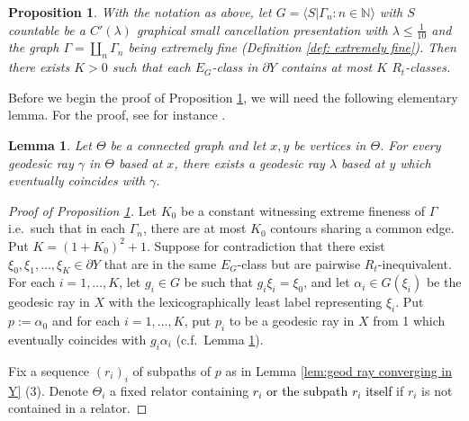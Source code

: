 \documentclass{article}[11pt]
\newtheorem{prop}[thm]{Proposition}
\newtheorem{lem}[thm]{Lemma}
\newcommand{\N}{\mathbb{N}}
\newcommand{\girth}{\mathrm{girth}}
\begin{document}
{\begin{prop}
    \label{prop: finite index}
    With the notation as above, let $G = \langle S \vert \Gamma_n : n \in \N \rangle$ with $S$ countable be a $C'(\lambda)$ graphical small cancellation presentation with $\lambda \leq \frac1{10}$ and the graph $\Gamma = \coprod_n \Gamma_n$ being extremely fine (Definition \ref{def: extremely fine}). Then there exists $K > 0$ such that each $E_G$-class in $\partial Y$ contains at most $K$ $R_t$-classes. 
\end{prop}

Before we begin the proof of Proposition \ref{prop: finite index}, we will need the following elementary lemma. For the proof, see for instance \cite[Lemma 3.1]{MS20}.


\begin{lem}
    \label{lem: moving geodesic basepoint}
    Let $\Theta$ be a connected graph and let $x,y$ be vertices in $\Theta$. For every geodesic ray $\gamma$ in $\Theta$ based at $x$, there exists a geodesic ray $\lambda$ based at $y$ which eventually coincides with $\gamma$. 
\end{lem}

\begin{proof}[Proof of Proposition \ref{prop: finite index}]
    
    Let $K_0$ be a constant witnessing extreme fineness of $\Gamma$ i.e.\ such that in each $\Gamma_n$, there are at most $K_0$ contours sharing a common edge. Put $K = (1+K_0)^2 + 1$. Suppose for contradiction that there exist $\xi_0,\xi_1,\ldots, \xi_K \in \partial Y$ that are in the same $E_G$-class but are pairwise $R_t$-inequivalent. For each $i = 1,\ldots,K$, let $g_i \in G$ be such that $g_i \xi_i = \xi_0$, and let $\alpha_i \in G(\xi_i)$ be the geodesic ray in $X$ with the lexicographically least label representing $\xi_i$. Put $p:=\alpha_0$ and for each $i=1,\ldots,K$, put $p_i$ to be a geodesic ray in $X$ from 1 which eventually coincides with $g_i \alpha_i$ (c.f.\ Lemma \ref{lem: moving geodesic basepoint}). %
    
    Fix a sequence $(r_i)_i$ of subpaths of $p$ as in Lemma \ref{lem:geod ray converging in Y} (3). Denote $\Theta_i$ a fixed relator containing \textcolor{black}{$r_i$ or the subpath $r_i$ itself} if $r_i$ is not contained in a relator. 
    


\end{proof}}
\end{document}
